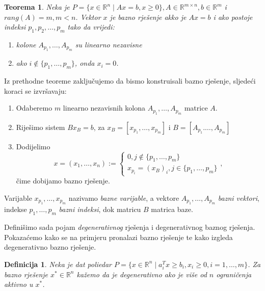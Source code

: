 \documentclass[a4paper, utf8, 11pt, colorlinks]{book}
\newtheorem{definition}{Definicija}
\newtheorem{thm}{Teorema}
\begin{document}
\begin{thm}
   Neka je $P = \{ x \in \mathbb{R}^n \mid A x = b, x \geq 0\}, A \in \mathbb{R}^{m \times n}, b \in \mathbb{R}^m$ i $rang(A)= m, m < n$.
   Vektor $x$ je bazno rješenje  akko je $A x = b$ i ako postoje indeksi $p_1,p_2,\ldots, p_m$ tako da vrijedi:
   \begin{enumerate}
       \item kolone $A_{p_1},\ldots, A_{p_m}$ su linearno nezavisne
       \item ako $i \notin \{p_1,\ldots, p_m\}$, onda $x_i = 0$.
   \end{enumerate}
   
\end{thm}
Iz prethodne teoreme zaključujemo da bismo  konstruisali bazno rješenje, sljedeći koraci se izvršavaju:
\begin{enumerate}
    \item Odaberemo $m$ linearno nezavisnih kolona $A_{p_1}, \ldots, A_{p_m}$ matrice $A$.
    \item Riješimo sistem $B x_B = b$, za $x_B = [x_{p_1}, \ldots, x_{p_m}]$ i $B= [A_{p_1}. \ldots, A_{p_m}]$
    \item Dodijelimo $$x = (x_1,\ldots, x_n):= \begin{cases}
    	          0, j  \not \in \{p_1,\ldots, p_m \} \\
    	         x_{p_i} = (x_B)_i, j \in \{ p_1,\ldots, p_m \}
    \end{cases},$$  čime dobijamo bazno rješenje. 
\end{enumerate}
Varijable $x_{p_1},\ldots, x_{p_m}$ nazivamo \emph{bazne varijable}, a vektore  $A_{p_1}, \ldots, A_{p_m}$ \emph{bazni vektori}, indekse $p_1,\ldots, p_m$ \emph{bazni indeksi}, dok matricu $B$ matrica baze. 


Definišimo sada pojam \emph{degenerativnog} rješenja i degenerativnog baznog rješenja. Pokazaćemo kako se na primjeru pronalazi bazno rješenje te kako izgleda degenerativno bazno rješenje.

\begin{definition}
      Neka je dat poliedar $P = \{ x \in \mathbb{R}^n \mid a_i^T x \geq b_i, x_i \geq 0, i=1,\ldots,m \}$. Za bazno rješenje $x^*\in \mathbb{R}^n$ kažemo da je degenerativno ako je više od $n$  ograničenja aktivno u $x^*$. 
      
\end{definition}
\end{document}
